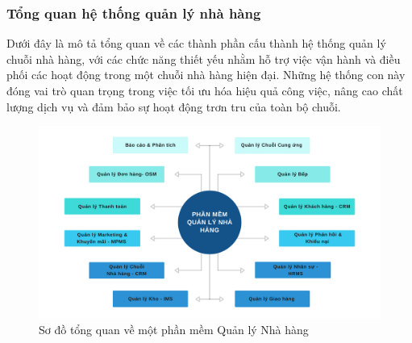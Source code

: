 

\subsubsection{Tổng quan hệ thống quản lý nhà hàng}

Dưới đây là mô tả tổng quan về các thành phần cấu thành hệ thống quản lý chuỗi nhà hàng, với các chức năng thiết yếu nhằm hỗ trợ việc vận hành và điều phối các hoạt động trong một chuỗi nhà hàng hiện đại. Những hệ thống con này đóng vai trò quan trọng trong việc tối ưu hóa hiệu quả công việc, nâng cao chất lượng dịch vụ và đảm bảo sự hoạt động trơn tru của toàn bộ chuỗi.

\begin{figure}[H]
    \centering
    \includegraphics[width=15cm]{Images/so-do-he-thong.png}
    \vspace{0.5cm}
    \caption{Sơ đồ tổng quan về một phần mềm Quản lý Nhà hàng}
    \label{fig:my_label}
\end{figure}


